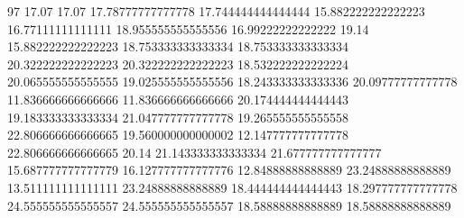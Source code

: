 97 17.07 17.07 17.78777777777778 17.744444444444444 15.882222222222223 16.77111111111111 18.955555555555556 16.99222222222222 19.14 15.882222222222223 18.753333333333334 18.753333333333334 20.322222222222223 20.322222222222223 18.532222222222224 20.065555555555555 19.025555555555556 18.243333333333336 20.09777777777778 11.836666666666666 11.836666666666666 20.174444444444443 19.183333333333334 21.047777777777778 19.265555555555558 22.806666666666665 19.560000000000002 12.147777777777778 22.806666666666665 20.14 21.143333333333334 21.677777777777777 15.687777777777779 16.127777777777776 12.84888888888889 23.24888888888889 13.511111111111111 23.24888888888889 18.444444444444443 18.297777777777778 24.555555555555557 24.555555555555557 18.58888888888889 18.58888888888889